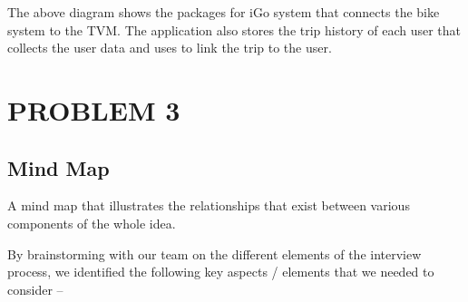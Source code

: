 The above diagram shows the packages for iGo system that connects the bike system to the TVM. The application also stores the trip history of each user that collects the user data and uses to link the trip to the user.


\section{PROBLEM 3}
\subsection{Mind Map}
A mind map that illustrates the relationships that exist between various components of the whole idea.

By brainstorming with our team on the different elements of the interview process, we identified the following key aspects / elements that we needed to consider – 
